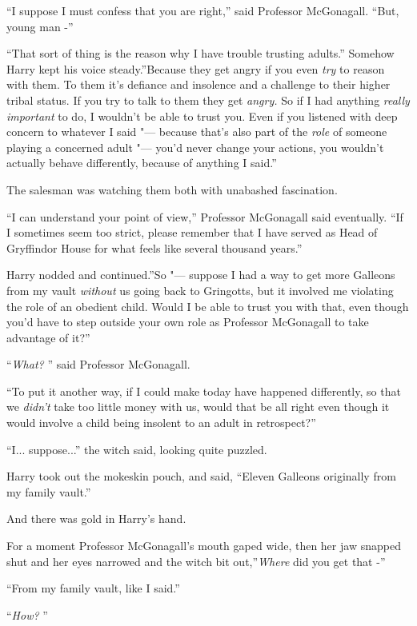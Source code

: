 ``I suppose I must confess that you are right,'' said Professor
McGonagall. ``But, young man -''

``That sort of thing is the reason why I have trouble trusting adults.''
Somehow Harry kept his voice steady.''Because they get angry if you even
\emph{try} to reason with them. To them it's defiance and insolence and
a challenge to their higher tribal status. If you try to talk to them
they get \emph{angry.} So if I had anything \emph{really}
\emph{important} to do, I wouldn't be able to trust you. Even if you
listened with deep concern to whatever I said "--- because that's also part
of the \emph{role} of someone playing a concerned adult "--- you'd never
change your actions, you wouldn't actually behave differently, because
of anything I said.''

The salesman was watching them both with unabashed fascination.

``I can understand your point of view,'' Professor McGonagall said
eventually. ``If I sometimes seem too strict, please remember that I
have served as Head of Gryffindor House for what feels like several
thousand years.''

Harry nodded and continued.''So "--- suppose I had a way to get more
Galleons from my vault \emph{without} us going back to Gringotts, but it
involved me violating the role of an obedient child. Would I be able to
trust you with that, even though you'd have to step outside your own
role as Professor McGonagall to take advantage of it?''

``\emph{What?} '' said Professor McGonagall.

``To put it another way, if I could make today have happened differently,
so that we \emph{didn't} take too little money with us, would that be
all right even though it would involve a child being insolent to an
adult in retrospect?''

``I... suppose...'' the witch said, looking quite puzzled.

Harry took out the mokeskin pouch, and said, ``Eleven Galleons
originally from my family vault.''

And there was gold in Harry's hand.

For a moment Professor McGonagall's mouth gaped wide, then her jaw
snapped shut and her eyes narrowed and the witch bit out,''\emph{Where}
did you get that -''

``From my family vault, like I said.''

``\emph{How?} ''

